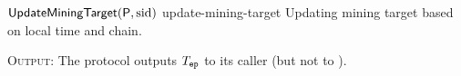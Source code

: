 \begin{cccProtocol}
    {$\mathsf{UpdateMiningTarget}(\mathsf{P}, \mathrm{sid})$}
    {update-mining-target}
    {Updating mining target based on local time and chain.}

    \begin{algorithmic}[1]

        
        
        \Else
        
        
        
        
        \EndIf
    \end{algorithmic}

    \textsc{Output}: The protocol outputs $T_\mathtt{ep}$ to its caller (but not to \Z).
\end{cccProtocol}